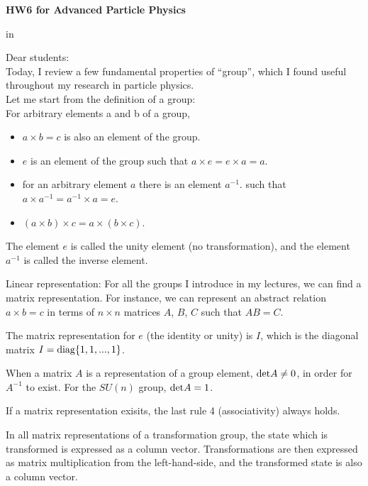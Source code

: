 \documentclass[12pt]{article}
\begin{document}
\begin{center}
{\large\bf HW6 for Advanced Particle Physics} \\

\end{center}

 in

Dear students:\\

  Today, I review a few fundamental properties of ``group'', which
  I found useful throughout my research in particle physics.\\

  Let me start from the definition of a group:\\

  For arbitrary elements a and b of a group,
  \begin{itemize}
      \item $a\times b = c$ is also an element of the group.
      \item $e$ is an element of the group such that $a \times e = e\times a = a$.
      \item for an arbitrary element $a$ there is an element $a^{-1}$.
      such that $a\times a^{-1} = a^{-1} \times a = e$.
      \item $(a\times b) \times c = a \times (b \times c)$.
  \end{itemize}

  The element $e$ is called the unity element (no transformation),
  and the element $a^{-1}$ is called the inverse element.

  Linear representation:  For all the groups I introduce in
  my lectures, we can find a matrix representation.  For instance,
  we can represent an abstract relation $a \times b = c$ in terms of
  $n \times n$ matrices $A$, $B$, $C$ such that $AB = C$.

  The matrix representation for $e$ (the identity or unity) is $I$,
  which is the diagonal matrix $I = {\rm diag} \{1,1,...,1 \}$.

  When a matrix $A$ is a representation of a group element,
  ${\rm det}{A} \neq 0$, in order for $A^{-1}$ to exist.
  For the $SU(n)$ group, ${\rm det}{A}=1$.

  If a matrix representation exisits, the last rule 4
  (associativity) always holds.

  In all matrix representations of a transformation group,
  the state which is transformed is expressed as a column
  vector.  Transformations are then expressed as matrix
  multiplication from the left-hand-side, and the transformed
  state is also a column vector.
\end{document}

